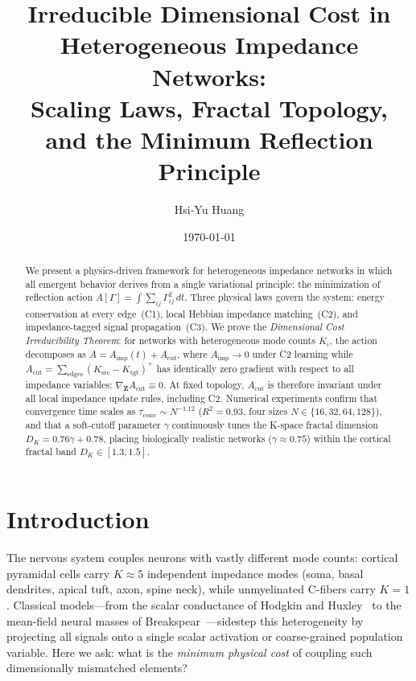 \documentclass[aps,pre,twocolumn,superscriptaddress,floatfix]{revtex4-2}
\newcommand{\Aimp}{A_{\text{imp}}}
\newcommand{\Acut}{A_{\text{cut}}}
\begin{document}
\title{Irreducible Dimensional Cost in Heterogeneous Impedance Networks:\\
       Scaling Laws, Fractal Topology, and the Minimum Reflection Principle}

\author{Hsi-Yu Huang}

\date{\today}

\begin{abstract}
We present a physics-driven framework for heterogeneous impedance
networks in which all emergent behavior derives from a single
variational principle: the minimization of reflection action
$A[\Gamma] = \int \sum_{ij} \Gamma_{ij}^2 \, dt$.
Three physical laws govern the system:
energy conservation at every edge~(C1),
local Hebbian impedance matching~(C2),
and impedance-tagged signal propagation~(C3).
We prove the \emph{Dimensional Cost Irreducibility Theorem}:
for networks with heterogeneous mode counts $K_i$,
the action decomposes as
$A = \Aimp(t) + \Acut$,
where $\Aimp \to 0$ under C2 learning
while $\Acut = \sum_{\text{edges}} (K_{\text{src}} - K_{\text{tgt}})^+$
has identically zero gradient with respect to all impedance
variables: $\nabla_{\mathbf{Z}} \Acut \equiv 0$.
At fixed topology, $\Acut$ is therefore invariant under
all local impedance update rules, including C2.
Numerical experiments confirm that convergence time scales as
$\tau_{\text{conv}} \sim N^{-1.12}$ ($R^2 = 0.93$, four sizes
$N \in \{16, 32, 64, 128\}$),
and that a soft-cutoff parameter $\gamma$ continuously tunes the
K-space fractal dimension
$D_K = 0.76\gamma + 0.78$,
placing biologically realistic networks ($\gamma \approx 0.75$)
within the cortical fractal band
$D_K \in [1.3, 1.5]$.
\end{abstract}

\maketitle

\section{Introduction}
\label{sec:intro}

The nervous system couples neurons with vastly different mode counts:
cortical pyramidal cells carry $K \approx 5$ independent impedance
modes (soma, basal dendrites, apical tuft, axon, spine neck),
while unmyelinated C-fibers carry $K = 1$.
Classical models---from the scalar conductance of
Hodgkin and Huxley~\cite{HH1952} to the mean-field neural
masses of Breakspear~\cite{Breakspear2017}---sidestep this
heterogeneity by projecting all signals onto a single
scalar activation or coarse-grained population variable.
Here we ask: what is the \emph{minimum physical cost} of coupling
such dimensionally mismatched elements?
\end{document}
